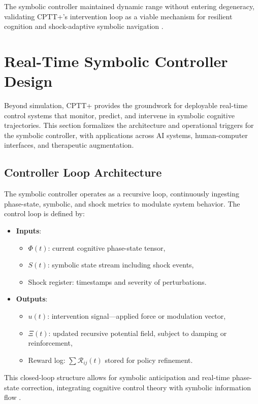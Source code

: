 \documentclass[12pt]{article}
\begin{document}
The symbolic controller maintained dynamic range without entering degeneracy, validating CPTT+'s intervention loop as a viable mechanism for resilient cognition and shock-adaptive symbolic navigation \cite{hassabis2017neuroscience, goertzel2014pattern}.

\section{Real-Time Symbolic Controller Design}

Beyond simulation, CPTT+ provides the groundwork for deployable real-time control systems that monitor, predict, and intervene in symbolic cognitive trajectories. This section formalizes the architecture and operational triggers for the symbolic controller, with applications across AI systems, human-computer interfaces, and therapeutic augmentation.

\subsection{Controller Loop Architecture}

The symbolic controller operates as a recursive loop, continuously ingesting phase-state, symbolic, and shock metrics to modulate system behavior. The control loop is defined by:

\begin{itemize}
  \item \textbf{Inputs}:
  \begin{itemize}
    \item $\Phi(t)$: current cognitive phase-state tensor,
    \item $S(t)$: symbolic state stream including shock events,
    \item Shock register: timestamps and severity of perturbations.
  \end{itemize}
  \item \textbf{Outputs}:
  \begin{itemize}
    \item $u(t)$: intervention signal—applied force or modulation vector,
    \item $\Xi(t)$: updated recursive potential field, subject to damping or reinforcement,
    \item Reward log: $\sum \mathcal{R}_{ij}(t)$ stored for policy refinement.
  \end{itemize}
\end{itemize}

This closed-loop structure allows for symbolic anticipation and real-time phase-state correction, integrating cognitive control theory with symbolic information flow \cite{miller2001integrative, zador2019critique}.
\end{document}
